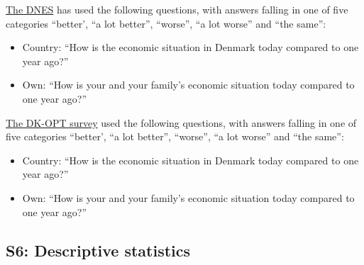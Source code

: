 \documentclass[a4paper,11pt]{article}
\begin{document}
	
	\noindent \ul{The DNES} has used the following questions, with answers falling in one of five categories ``better', ``a lot better'', ``worse'', ``a lot worse'' and ``the same'':
	
	\begin{itemize}	
		\item Country: ``How is the economic situation in Denmark today compared to one year ago?'' 
		\item Own: ``How is your and your family's economic situation today compared to one year ago?''
	\end{itemize}   
	
	\noindent \ul{The DK-OPT survey} used the following questions, with answers falling in one of five categories ``better', ``a lot better'', ``worse'', ``a lot worse'' and ``the same'':
	
	\begin{itemize}
		
		\item Country: ``How is the economic situation in Denmark today compared to one year ago?'' 
		\item Own: ``How is your and your family's economic situation today compared to one year ago?''
	\end{itemize}  
	
	\newpage
	
	
	\subsection*{S6: Descriptive statistics}
	
	
	
	
	
	
	
	
\end{document}
